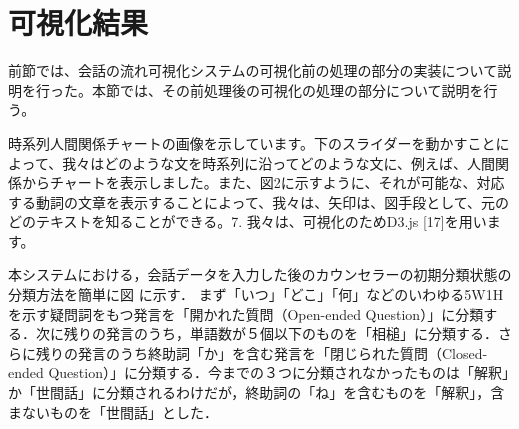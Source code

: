 \documentclass[shuuron]{kuee}
\begin{document}
\section{可視化結果}

前節では、会話の流れ可視化システムの可視化前の処理の部分の実装について説明を行った。本節では、その前処理後の可視化の処理の部分について説明を行う。



時系列人間関係チャートの画像を示しています。下のスライダーを動かすことによって、我々はどのような文を時系列に沿ってどのような文に、例えば、人間関係からチャートを表示しました。また、図2に示すように、それが可能な、対応する動詞の文章を表示することによって、我々は、矢印は、図手段として、元のどのテキストを知ることができる。7. 我々は、可視化のためD3.js [17]を用います。



本システムにおける，会話データを入力した後のカウンセラーの初期分類状態の分類方法を簡単に図
に示す．
まず「いつ」「どこ」「何」などのいわゆる5W1Hを示す疑問詞をもつ発言を「開かれた質問（Open-ended Question）」に分類する．次に残りの発言のうち，単語数が５個以下のものを「相槌」に分類する．さらに残りの発言のうち終助詞「か」を含む発言を「閉じられた質問（Closed-ended Question）」に分類する．今までの３つに分類されなかったものは「解釈」か「世間話」に分類されるわけだが，終助詞の「ね」を含むものを「解釈」，含まないものを「世間話」とした．
\end{document}
